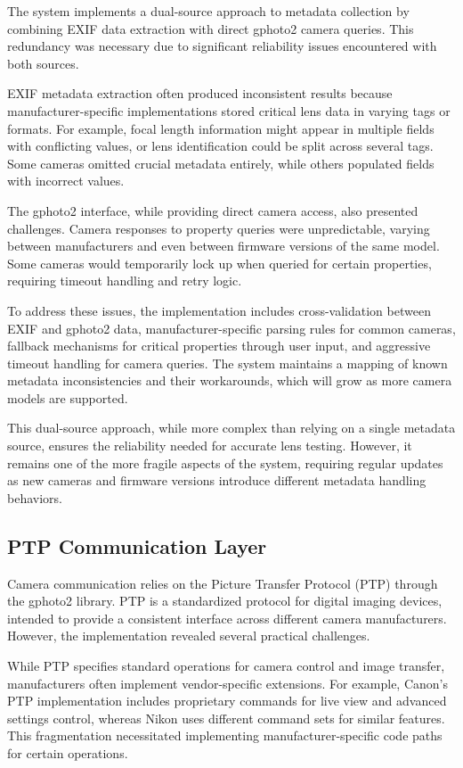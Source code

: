 The system implements a dual-source approach to metadata collection by combining EXIF data extraction with direct gphoto2 camera queries. This redundancy was necessary due to significant reliability issues encountered with both sources.

EXIF metadata extraction often produced inconsistent results because manufacturer-specific implementations stored critical lens data in varying tags or formats. For example, focal length information might appear in multiple fields with conflicting values, or lens identification could be split across several tags. Some cameras omitted crucial metadata entirely, while others populated fields with incorrect values.

The gphoto2 interface, while providing direct camera access, also presented challenges. Camera responses to property queries were unpredictable, varying between manufacturers and even between firmware versions of the same model. Some cameras would temporarily lock up when queried for certain properties, requiring timeout handling and retry logic.

To address these issues, the implementation includes cross-validation between EXIF and gphoto2 data, manufacturer-specific parsing rules for common cameras, fallback mechanisms for critical properties through user input, and aggressive timeout handling for camera queries. The system maintains a mapping of known metadata inconsistencies and their workarounds, which will grow as more camera models are supported.

This dual-source approach, while more complex than relying on a single metadata source, ensures the reliability needed for accurate lens testing. However, it remains one of the more fragile aspects of the system, requiring regular updates as new cameras and firmware versions introduce different metadata handling behaviors.

\subsection{PTP Communication Layer}

Camera communication relies on the Picture Transfer Protocol (PTP) through the gphoto2 library. PTP is a standardized protocol for digital imaging devices, intended to provide a consistent interface across different camera manufacturers. However, the implementation revealed several practical challenges.

While PTP specifies standard operations for camera control and image transfer, manufacturers often implement vendor-specific extensions. For example, Canon's PTP implementation includes proprietary commands for live view and advanced settings control, whereas Nikon uses different command sets for similar features. This fragmentation necessitated implementing manufacturer-specific code paths for certain operations.

